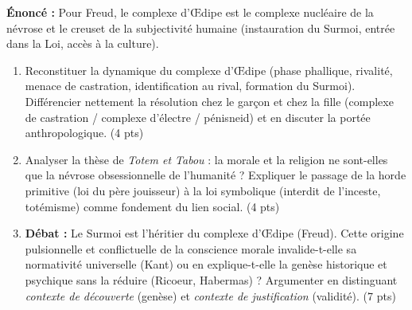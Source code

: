 \documentclass[11pt]{article}
\begin{document}
\begin{exercice}
\textbf{Énoncé :} Pour Freud, le complexe d'Œdipe est le \og complexe nucléaire \fg{} de la névrose et le creuset de la subjectivité humaine (instauration du Surmoi, entrée dans la Loi, accès à la culture).
\begin{enumerate}
    \item Reconstituer la dynamique du complexe d'Œdipe (phase phallique, rivalité, menace de castration, identification au rival, formation du Surmoi). Différencier nettement la résolution chez le garçon et chez la fille (complexe de castration / complexe d'électre / pénisneid) et en discuter la portée anthropologique. (4 pts)
    \item Analyser la thèse de \textit{Totem et Tabou} : la morale et la religion ne sont-elles que la \og névrose obsessionnelle de l'humanité \fg{} ? Expliquer le passage de la \og horde primitive \fg{} (loi du père jouisseur) à la \og loi symbolique \fg{} (interdit de l'inceste, totémisme) comme fondement du lien social. (4 pts)
    \item \textbf{Débat :} \og Le Surmoi est l'héritier du complexe d'Œdipe \fg{} (Freud). Cette origine pulsionnelle et conflictuelle de la conscience morale invalide-t-elle sa normativité universelle (Kant) ou en explique-t-elle la genèse historique et psychique sans la réduire (Ricoeur, Habermas) ? Argumenter en distinguant \textit{contexte de découverte} (genèse) et \textit{contexte de justification} (validité). (7 pts)
\end{enumerate}
\end{exercice}
\end{document}
